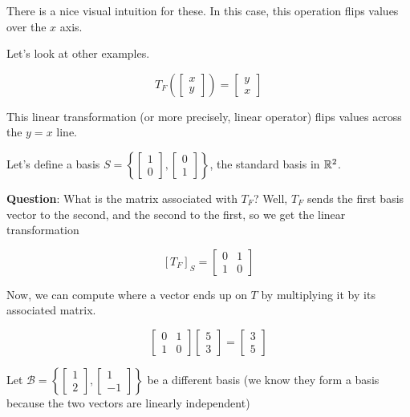 \documentclass[12pt]{article}
\def\B{\mathcal B}
\begin{document}
  There is a nice visual intuition for these. In this case, this operation flips
  values over the $x$ axis.

  Let's look at other examples.

  \[
    T_F \left(\begin{bmatrix} x \\ y \end{bmatrix}\right) = \begin{bmatrix} y \\ x \end{bmatrix}
  \]

  This linear transformation (or more precisely, linear operator) flips values
  across the $y = x$ line.

  Let's define a basis $S = \left\{\begin{bmatrix} 1 \\ 0 \end{bmatrix},
  \begin{bmatrix} 0 \\ 1 \end{bmatrix}\right\}$, the standard basis in ${\mathbb R}^2$.

  {\bf Question}: What is the matrix associated with $T_F$? Well, $T_F$ sends
  the first basis vector to the second, and the second to the first, so we get
  the linear transformation

  \[
    [T_F]_S = \begin{bmatrix}
      0 & 1 \\
      1 & 0
    \end{bmatrix}
  \]

  Now, we can compute where a vector ends up on $T$ by multiplying it by its
  associated matrix.

  \[
    \begin{bmatrix}
      0 & 1 \\
      1 & 0
    \end{bmatrix}
    \begin{bmatrix}
      5 \\ 3
    \end{bmatrix}
    =
    \begin{bmatrix}
      3 \\ 5
    \end{bmatrix}
  \]

  Let $\B = \left\{\begin{bmatrix} 1 \\ 2 \end{bmatrix}, \begin{bmatrix} 1 \\ -1
  \end{bmatrix}\right\}$ be a different basis (we know they form a basis because the two
  vectors are linearly independent)
\end{document}
